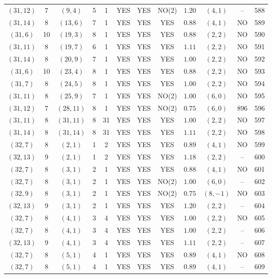 \begin{longtable}{|c|c|c|c|c|c|c|c|c|c|c|c|}
$(31,12)$ & 7 & $(9,4)$ & 5 & 1 & YES & YES & NO(2) & $1.20$ & $(4,1)$ & -- & 588\\
$(31,14)$ & 8 & $(13,6)$ & 7 & 1 & YES & YES & YES & $0.88$ & $(4,1)$ & NO & 589\\
$(31,6)$ & 10 & $(19,3)$ & 8 & 1 & YES & YES & YES & $0.88$ & $(2,2)$ & NO & 590\\
$(31,11)$ & 8 & $(19,7)$ & 6 & 1 & YES & YES & YES & $1.11$ & $(2,2)$ & NO & 591\\
$(31,14)$ & 8 & $(20,9)$ & 7 & 1 & YES & YES & YES & $1.00$ & $(2,2)$ & NO & 592\\
$(31,6)$ & 10 & $(23,4)$ & 8 & 1 & YES & YES & YES & $0.88$ & $(2,2)$ & NO & 593\\
$(31,7)$ & 8 & $(24,5)$ & 8 & 1 & YES & YES & YES & $1.00$ & $(2,2)$ & NO & 594\\
$(31,11)$ & 8 & $(25,9)$ & 7 & 1 & YES & YES & NO(2) & $1.00$ & $(6,0)$ & NO & 595\\
$(31,12)$ & 7 & $(28,11)$ & 8 & 1 & YES & YES & NO(2) & $0.75$ & $(6,0)$ & 896 & 596\\
$(31,11)$ & 8 & $(31,11)$ & 8 & 31 & YES & YES & YES & $1.00$ & $(2,2)$ & NO & 597\\
$(31,14)$ & 8 & $(31,14)$ & 8 & 31 & YES & YES & YES & $1.11$ & $(2,2)$ & NO & 598\\
$(32,7)$ & 8 & $(2,1)$ & 1 & 2 & YES & YES & YES & $0.89$ & $(4,1)$ & NO & 599\\
$(32,13)$ & 9 & $(2,1)$ & 1 & 2 & YES & YES & YES & $1.18$ & $(2,2)$ & -- & 600\\
$(32,7)$ & 8 & $(3,1)$ & 2 & 1 & YES & YES & YES & $0.88$ & $(4,1)$ & NO & 601\\
$(32,7)$ & 8 & $(3,1)$ & 2 & 1 & YES & YES & NO(2) & $1.00$ & $(6,0)$ & -- & 602\\
$(32,9)$ & 8 & $(3,1)$ & 2 & 1 & YES & YES & NO(2) & $0.75$ & $(8,-1)$ & NO & 603\\
$(32,13)$ & 9 & $(3,1)$ & 2 & 1 & YES & YES & YES & $1.20$ & $(2,2)$ & -- & 604\\
$(32,7)$ & 8 & $(4,1)$ & 3 & 4 & YES & YES & YES & $1.00$ & $(2,2)$ & NO & 605\\
$(32,7)$ & 8 & $(4,1)$ & 3 & 4 & YES & YES & YES & $1.00$ & $(2,2)$ & -- & 606\\
$(32,13)$ & 9 & $(4,1)$ & 3 & 4 & YES & YES & YES & $1.11$ & $(2,2)$ & -- & 607\\
$(32,7)$ & 8 & $(5,1)$ & 4 & 1 & YES & YES & YES & $0.89$ & $(4,1)$ & NO & 608\\
$(32,7)$ & 8 & $(5,1)$ & 4 & 1 & YES & YES & YES & $0.89$ & $(4,1)$ & -- & 609\\

\end{longtable}
